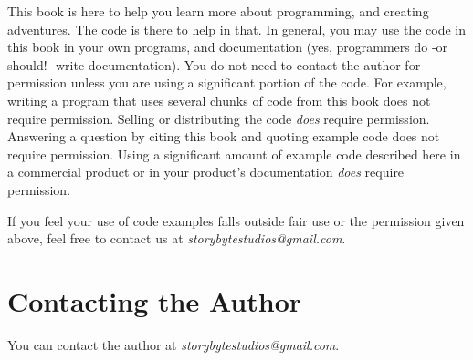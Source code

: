 This book is here to help you learn more about programming, and creating adventures. The code is there to help in that. In general, you may use the code in this book in your own programs, and documentation (yes, programmers do -or should!- write documentation). You do not need to contact the author for permission unless you are using a significant portion of the code. For example, writing a program that uses several chunks of code from this book does not require permission. Selling or distributing the code \emph{does} require permission. Answering a question by citing this book and quoting example code does not require permission. Using a significant amount of example code described here in a commercial product or in your product's documentation \emph{does} require permission. 

If you feel your use of code examples falls outside fair use or the permission given above, feel free to contact us at \textit{storybytestudios@gmail.com}.    

\section{Contacting the Author}

You can contact the author at \textit{storybytestudios@gmail.com}.   





